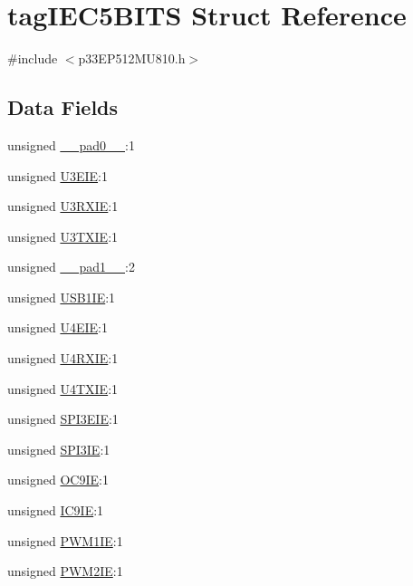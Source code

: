 \hypertarget{structtag_i_e_c5_b_i_t_s}{}\section{tag\+I\+E\+C5\+B\+I\+TS Struct Reference}
\label{structtag_i_e_c5_b_i_t_s}


{\ttfamily \#include $<$p33\+E\+P512\+M\+U810.\+h$>$}

\subsection*{Data Fields}
\begin{DoxyCompactItemize}
\item 
unsigned \hyperlink{structtag_i_e_c5_b_i_t_s_adf71f3d8410c1f1dbbc96680a92c49af}{\+\_\+\+\_\+pad0\+\_\+\+\_\+}\+:1
\item 
unsigned \hyperlink{structtag_i_e_c5_b_i_t_s_a95ef4b6985c4bd38ebb7e8ff321ada72}{U3\+E\+IE}\+:1
\item 
unsigned \hyperlink{structtag_i_e_c5_b_i_t_s_a7f44121e745691213142860ac82efe21}{U3\+R\+X\+IE}\+:1
\item 
unsigned \hyperlink{structtag_i_e_c5_b_i_t_s_a2271a5ba898499361ac546dec858cfd1}{U3\+T\+X\+IE}\+:1
\item 
unsigned \hyperlink{structtag_i_e_c5_b_i_t_s_acaf2d0924a107ec6e8d2e31febaf66f9}{\+\_\+\+\_\+pad1\+\_\+\+\_\+}\+:2
\item 
unsigned \hyperlink{structtag_i_e_c5_b_i_t_s_aada74c031c9eaac776cc9f6ef8645ce1}{U\+S\+B1\+IE}\+:1
\item 
unsigned \hyperlink{structtag_i_e_c5_b_i_t_s_ab0ed3fd0b8a22b86a4093bc22f186ad0}{U4\+E\+IE}\+:1
\item 
unsigned \hyperlink{structtag_i_e_c5_b_i_t_s_a5b4e4d5b514f8e871fdb60b35e8861bb}{U4\+R\+X\+IE}\+:1
\item 
unsigned \hyperlink{structtag_i_e_c5_b_i_t_s_a0b64eeb5f98d491cd4bb8e95c98182e3}{U4\+T\+X\+IE}\+:1
\item 
unsigned \hyperlink{structtag_i_e_c5_b_i_t_s_accfb82d50d998905640c891ece98d841}{S\+P\+I3\+E\+IE}\+:1
\item 
unsigned \hyperlink{structtag_i_e_c5_b_i_t_s_ad0f6b4d3077726eeabfc21a80e024d95}{S\+P\+I3\+IE}\+:1
\item 
unsigned \hyperlink{structtag_i_e_c5_b_i_t_s_a10e5cdbfa909c8dd1ae7cfe2cbeb5ff3}{O\+C9\+IE}\+:1
\item 
unsigned \hyperlink{structtag_i_e_c5_b_i_t_s_a8de7736805d47b427560aad689164118}{I\+C9\+IE}\+:1
\item 
unsigned \hyperlink{structtag_i_e_c5_b_i_t_s_a236d27d983832425f80ac5266d8351ce}{P\+W\+M1\+IE}\+:1
\item 
unsigned \hyperlink{structtag_i_e_c5_b_i_t_s_afea975b1908c3798a3d5cac2f9234783}{P\+W\+M2\+IE}\+:1
\end{DoxyCompactItemize}


